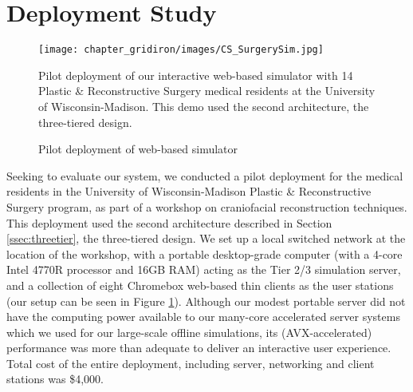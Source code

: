  \section{Deployment Study}
\label{sec:pilot}
 
 \begin{figure}[t]
\texttt{[image: chapter\_gridiron/images/CS\_SurgerySim.jpg]}

\caption{Pilot deployment of web-based simulator}{Pilot deployment of
  our interactive web-based simulator with 14 Plastic \&
  Reconstructive Surgery medical residents at the University of
  Wisconsin-Madison. This demo used the second architecture, the
  three-tiered design.}

\label{fig:pilot}
\end{figure}


Seeking to evaluate our system, we conducted a pilot deployment for
the medical residents in the University of Wisconsin-Madison Plastic
\& Reconstructive Surgery program, as part of a workshop on
craniofacial reconstruction techniques. This deployment used the
second architecture described in Section \ref{ssec:threetier}, the
three-tiered design. We set up a local switched network at the
location of the workshop, with a portable desktop-grade computer (with
a 4-core Intel 4770R processor and 16GB RAM) acting as the Tier 2/3
simulation server, and a collection of eight Chromebox web-based thin
clients as the user stations (our setup can be seen in Figure
\ref{fig:pilot}). Although our modest portable server did not have the
computing power available to our many-core accelerated server systems
which we used for our large-scale offline simulations, its
(AVX-accelerated) performance was more than adequate to deliver an
interactive user experience. Total cost of the entire deployment,
including server, networking and client stations was \$4,000.

